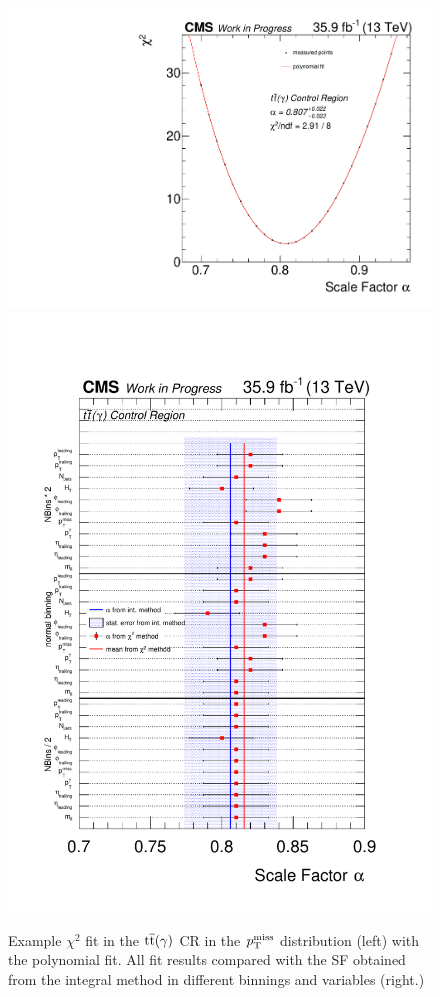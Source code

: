 \begin{figure}[tbp]
 \centering
 \includegraphics[width=\pairwidth]{figures/plots_CR/chi/TT_met}
 \includegraphics[width=\pairwidth]{figures/plots_CR/chi/TT_Compare}
 \caption{Example $\chi^2$ fit in the ${\mathrm{t}\overline{\mathrm{t}}}(\gamma)$ CR in the $p_{\mathrm{T}}^\text{miss}$ distribution (left) with the polynomial fit. All fit results compared with the SF obtained from the integral method in different binnings and variables (right.)}
 \label{fig:chiTT}
\end{figure}

